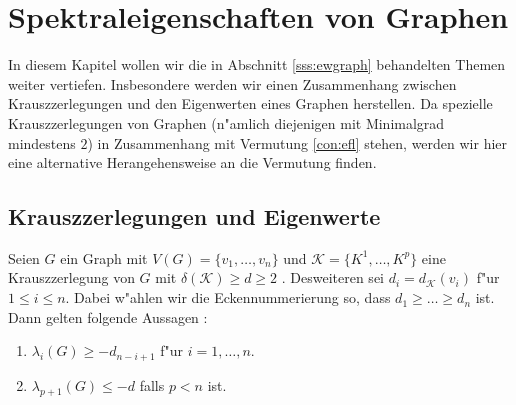 \section{Spektraleigenschaften von Graphen}

In diesem Kapitel wollen wir die in Abschnitt \ref{sss:ewgraph} behandelten Themen weiter vertiefen. Insbesondere werden wir einen Zusammenhang zwischen Krauszzerlegungen und den Eigenwerten eines Graphen herstellen. Da spezielle Krauszzerlegungen von Graphen (n"amlich diejenigen mit Minimalgrad mindestens $2$) in Zusammenhang mit Vermutung \ref{con:efl} stehen, werden wir hier eine alternative Herangehensweise an die Vermutung finden. 

\subsection{Krauszzerlegungen und Eigenwerte}
\begin{theorem}
  \label{thm:KrauszEigenwerte}
  Seien $G$ ein Graph mit $V(G)=\{v_1,\dots,v_n\}$ und $\mathcal K=\{K^1,\dots,K^p\}$ eine Krauszzerlegung von $G$ mit $\delta(\mathcal K) \geq d \geq 2$ . Desweiteren sei $d_i = d_{\mathcal{K}}(v_{i})$ f"ur $1\leq i \leq n$. 
  Dabei w"ahlen wir die Eckennummerierung so, dass $d_1 \geq \dots \geq d_{n}$ ist.
  Dann gelten folgende Aussagen : 
  \begin{enumerate}[label=\rm{(\alph*)}]
    \item $\lambda_i(G) \geq -d_{n-i+1}$ f"ur $i = 1, \dots , n$.
    \item $\lambda_{p+1}(G) \leq -d$ falls $p < n$ ist.
  \end{enumerate}
\end{theorem}

